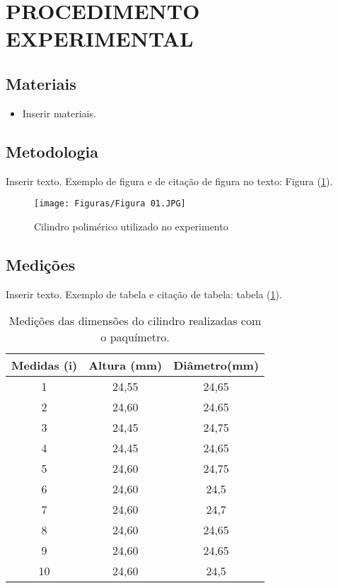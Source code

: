 \section{PROCEDIMENTO EXPERIMENTAL}

\subsection{Materiais}

\begin{itemize}
    \item Inserir materiais.
\end{itemize}

\subsection{Metodologia}

Inserir texto. Exemplo de figura e de citação de figura no texto: Figura (\ref{fCil}).

\begin{figure}[H]
    \centering
    \caption{Cilindro polimérico utilizado no experimento}
    \texttt{[image: Figuras/Figura 01.JPG]}\\
    \autoria
    \label{fCil}
\end{figure}


\subsection{Medições}

Inserir texto. Exemplo de tabela e citação de tabela: tabela (\ref{tCilPaq}).

\begin{table}[H]
\centering
\caption{Medições das dimensões do cilindro realizadas com o paquímetro.}
\label{tCilPaq}
\begin{tabular}{ccc}
\hline
Medidas (i) & Altura (mm) & Diâmetro(mm)\\
\hline
1 & 24,55 & 24,65 \\
2 & 24,60 & 24,65 \\
3 & 24,45 & 24,75 \\
4 & 24,45 & 24,65 \\
5 & 24,60 & 24,75 \\
6 & 24,60 & 24,5 \\
7 & 24,60 & 24,7 \\
8 & 24,60 & 24,65 \\
9 & 24,60 & 24,65 \\
10 & 24,60 & 24,5\\
\hline
\end{tabular}\\
\autoria
\end{table}